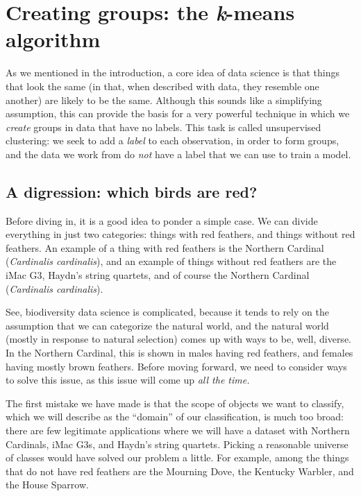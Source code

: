 \documentclass[
  letterpaper,
]{scrbook}
\begin{document}

\hypertarget{creating-groups-the-k-means-algorithm}{%
\chapter{\texorpdfstring{Creating groups: the \emph{k}-means
algorithm}{Creating groups: the k-means algorithm}}\label{creating-groups-the-k-means-algorithm}}

As we mentioned in the introduction, a core idea of data science is that
things that look the same (in that, when described with data, they
resemble one another) are likely to be the same. Although this sounds
like a simplifying assumption, this can provide the basis for a very
powerful technique in which we \emph{create} groups in data that have no
labels. This task is called unsupervised clustering: we seek to add a
\emph{label} to each observation, in order to form groups, and the data
we work from do \emph{not} have a label that we can use to train a
model.

\hypertarget{a-digression-which-birds-are-red}{%
\section{A digression: which birds are
red?}\label{a-digression-which-birds-are-red}}

Before diving in, it is a good idea to ponder a simple case. We can
divide everything in just two categories: things with red feathers, and
things without red feathers. An example of a thing with red feathers is
the Northern Cardinal (\emph{Cardinalis cardinalis}), and an example of
things without red feathers are the iMac G3, Haydn's string quartets,
and of course the Northern Cardinal (\emph{Cardinalis cardinalis}).

See, biodiversity data science is complicated, because it tends to rely
on the assumption that we can categorize the natural world, and the
natural world (mostly in response to natural selection) comes up with
ways to be, well, diverse. In the Northern Cardinal, this is shown in
males having red feathers, and females having mostly brown feathers.
Before moving forward, we need to consider ways to solve this issue, as
this issue will come up \emph{all the time.}

The first mistake we have made is that the scope of objects we want to
classify, which we will describe as the ``domain'' of our
classification, is much too broad: there are few legitimate applications
where we will have a dataset with Northern Cardinals, iMac G3s, and
Haydn's string quartets. Picking a reasonable universe of classes would
have solved our problem a little. For example, among the things that do
not have red feathers are the Mourning Dove, the Kentucky Warbler, and
the House Sparrow.
\end{document}
